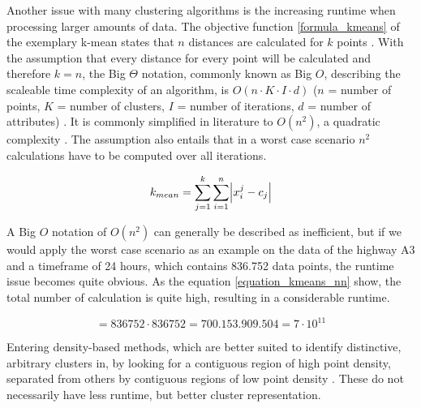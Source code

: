 Another issue with many clustering algorithms is the increasing runtime when processing larger amounts of data. The objective function \ref{formula_kmeans} of the exemplary k-mean states that $n$ distances are calculated for $k$ points \parencite{Santhanam2010}. With the assumption that every distance for every point will be calculated and therefore $k=n$, the Big $\Theta$ notation, commonly known as Big $O$, describing the scaleable time complexity of an algorithm, is $O(n \cdot K \cdot I \cdot d)$ ($n$ = number of points, $K$ = number of clusters, $I$ = number of iterations, $d$ = number of attributes) \parencite{Dalatu2016}. It is commonly simplified in literature to $O(n^2)$, a quadratic complexity \parencite{Pakhira2014}. The assumption also entails that in a worst case scenario $n^2$ calculations have to be computed over all iterations.

\begin{equation}
\label{formula_kmeans}
	k_{mean} =  \sum_{j=1}^k{\sum_{i=1}^n{\abs{x_i^j-c_j}}}
\end{equation}

\bigskip

A Big $O$ notation of $O(n^2)$ can generally be described as inefficient, but if we would apply the worst case scenario as an example on the data of the highway A3 and a timeframe of 24 hours, which contains 836.752 data points, the runtime issue becomes quite obvious. As the equation \ref{equation_kmeans_nn} show, the total number of calculation is quite high, resulting in a considerable runtime. \parencite{Busch2004}

\begin{equation}
\label{equation_kmeans_nn}
	 = 836752 \cdot 836752 = 700.153.909.504 = 7 \cdot 10^{11}
\end{equation}

\bigskip

Entering density-based methods, which are better suited to identify distinctive, arbitrary clusters in, by looking for a contiguous region of high point density, separated from others by contiguous regions of low point density \parencite{Chauhan2020}. These do not necessarily have less runtime, but better cluster representation.

